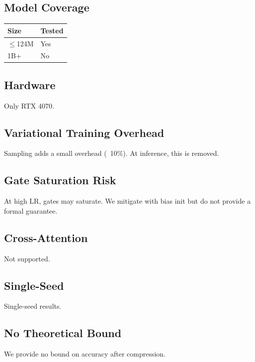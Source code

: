 \subsection{Model Coverage}

\begin{table}[H]
\centering
\small
\begin{tabular}{ll}
\toprule
\textbf{Size} & \textbf{Tested} \\
\midrule
$\le$124M & Yes \\
1B+ & No \\
\bottomrule
\end{tabular}
\end{table}

\subsection{Hardware}

Only RTX 4070.

\subsection{Variational Training Overhead}

Sampling adds a small overhead (~10\%). At inference, this is removed.

\subsection{Gate Saturation Risk}

At high LR, gates may saturate. We mitigate with bias init but do not 
provide a formal guarantee.

\subsection{Cross-Attention}

Not supported.

\subsection{Single-Seed}

Single-seed results.

\subsection{No Theoretical Bound}

We provide no bound on accuracy after compression.

